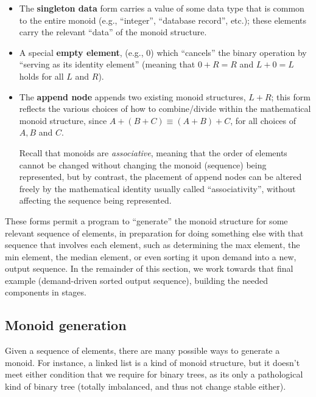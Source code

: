\documentclass[11pt]{article}
\begin{document}
\begin{itemize}

\item The \textbf{singleton data} form carries a value of some data type that is common to the entire monoid (e.g., ``integer'', ``database record'', etc.); these elements carry the relevant ``data'' of the monoid structure.

\item A special \textbf{empty element}, (e.g., $0$) which ``cancels'' the binary operation by ``serving as its identity element'' (meaning that $0 + R = R$ and $L + 0 = L$ holds for all $L$ and $R$).

\item The \textbf{append node} appends two existing monoid structures,  $L + R$; this form reflects the various choices of how to combine/divide within the mathematical monoid structure, since $A + (B + C) \equiv (A + B) + C$, for all choices of $A, B$ and $C$.

  Recall that monoids are \emph{associative}, meaning that the order of elements cannot be changed without changing the monoid (sequence) being represented, but by contrast, the placement of append nodes can be altered freely by the mathematical identity usually called ``associativity'', without affecting the sequence being represented.

\end{itemize}

These forms permit a program to ``generate'' the monoid structure for
some relevant sequence of elements, in preparation for doing something
else with that sequence that involves each element, such as
determining the max element, the min element, the median element, or
even sorting it upon demand into a new, output sequence.
%
In the remainder of this section, we work towards that final example
(demand-driven sorted output sequence), building the needed components
in stages.

\subsection{Monoid generation}

Given a sequence of elements, there are many possible ways to generate a monoid.
%
For instance, a linked list is a kind of monoid structure, but it
doesn't meet either condition that we require for binary trees, as its
only a pathological kind of binary tree (totally imbalanced, and thus
not change stable either).
\end{document}
